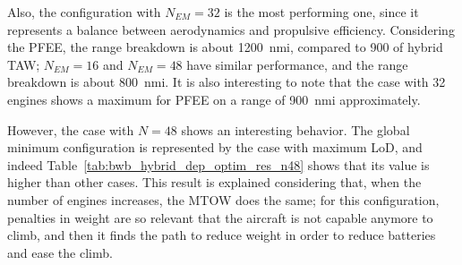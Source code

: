 Also, the configuration with $N_{EM}=32$ is the most performing one, since it represents a balance between aerodynamics and propulsive efficiency. 
Considering the PFEE, the range breakdown is about 1200~nmi, compared to 900 of hybrid TAW; $N_{EM}=16$ and $N_{EM}=48$ have similar performance, and the range breakdown is about 800~nmi. 
It is also interesting to note that the case with 32 engines shows a maximum for PFEE on a range of 900~nmi approximately.

However, the case with $N=48$ shows an interesting behavior.
The global minimum configuration is represented by the case with maximum LoD, and indeed Table~\ref{tab:bwb_hybrid_dep_optim_res_n48} shows that its value is higher than other cases. 
This result is explained considering that, when the number of engines increases, the MTOW does the same; for this configuration, penalties in weight are so relevant that the aircraft is not capable anymore to climb, and then it finds the path to reduce weight in order to reduce batteries and ease the climb. 

